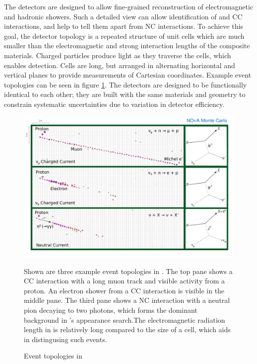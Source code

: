  The \nova detectors are designed to allow fine-grained reconstruction of electromagnetic and hadronic showers.
 Such a detailed view can allow identification of \numu and \nue CC
 interactions, and help to tell them apart from NC interactions.  To achieve this goal, the detector topology is a repeated structure of unit cells which are much smaller than the electromagnetic and strong interaction lengths of the composite materials.  Charged particles produce light as they traverse the cells, which enables detection.  Cells are long, but arranged in alternating horizontal and vertical planes to provide measurements of Cartesian coordinates.
 Example event topologies can be seen in figure \ref{eventtopnue}.
 The detectors are designed to be functionally identical to each other; they are built with the same materials and geometry to constrain systematic uncertainties due to variation in detector efficiency.

\begin{figure}[t]
\begin{center}
\includegraphics[width=\textwidth]{figures/figures/event_topology_nue.pdf}
\end{center}
\caption{Event topologies in \nova}{Shown are three example event topologies in
\nova.  The top pane shows a \numu CC interaction with a long muon track and
visible activity from a proton.  An electron shower from a \nue CC interaction
is visible in the middle pane.  The third pane shows a NC interaction
with a neutral pion decaying to two photons, which forms the dominant
background in \nova's \nue appearance search.The electromagnetic
radiation length in \nova is relatively long compared to the size of a cell,
which aids in distingusing such events.}
\label{eventtopnue}
\end{figure}


